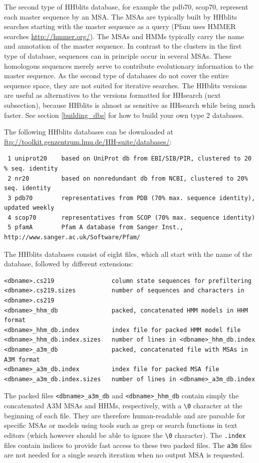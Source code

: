 \documentclass[11pt,a4paper]{article}
\begin{document}
The second type of HHblits database, for example the pdb70, scop70, represent each master sequence by an MSA. The MSAs are typically built by HHblits searches starting with the master sequence as a query (Pfam uses HMMER searches \url{http://hmmer.org/}). The MSAs and HMMs typically carry the name and annotation of the master sequence. In contrast to the clusters in the first type of database, sequences can in principle occur in several MSAs. These homologous sequences merely serve to contribute evolutionary information to the master sequence. As the second type of databases do not cover the entire sequence space, they are not suited for iterative searches. The HHblits versions are useful as alternatives to the versions formatted for HHsearch (next subsection), because HHblits is almost as sensitive as HHsearch while being much faster. See  section \ref{building_dbs} for how to build your own type 2 databases.

The following HHblits databases can be downloaded at \url{ftp://toolkit.genzentrum.lmu.de/HH-suite/databases/}: 
\small 
\begin{verbatim}
 1 uniprot20    based on UniProt db from EBI/SIB/PIR, clustered to 20 % seq. identity
 2 nr20         based on nonredundant db from NCBI, clustered to 20% seq. identity
 3 pdb70        representatives from PDB (70% max. sequence identity), updated weekly
 4 scop70       representatives from SCOP (70% max. sequence identity)
 5 pfamA        Pfam A database from Sanger Inst., http://www.sanger.ac.uk/Software/Pfam/
\end{verbatim} 
\normalsize

The HHblits databases consist of eight files, which all start with the name of the database, followed by different extensions:
\begin{verbatim}
<dbname>.cs219                column state sequences for prefiltering
<dbname>.cs219.sizes          number of sequences and characters in <dbname>.cs219  
<dbname>_hhm_db               packed, concatenated HMM models in HHM format
<dbname>_hhm_db.index         index file for packed HMM model file
<dbname>_hhm_db.index.sizes   number of lines in <dbname>_hhm_db.index
<dbname>_a3m_db               packed, concatenated file with MSAs in A3M format
<dbname>_a3m_db.index         index file for packed MSA file
<dbname>_a3m_db.index.sizes   number of lines in <dbname>_a3m_db.index
\end{verbatim}

The packed files \verb`<dbname>_a3m_db` and \verb`<dbname>_hhm_db` contain simply the concatenated A3M MSAs and HHMs, respectively, with a \verb`\0` character at the beginning of each file. They are therefore human-readable and are parsable for specific MSAs or models using tools such as grep or search functions in text editors (which however should be able to ignore the \verb`\0` character). The \verb`.index` files contain indices to provide fast access to these two packed files. The \verb`a3m` files are not needed for a single search iteration when no output MSA is requested. 
\end{document}

